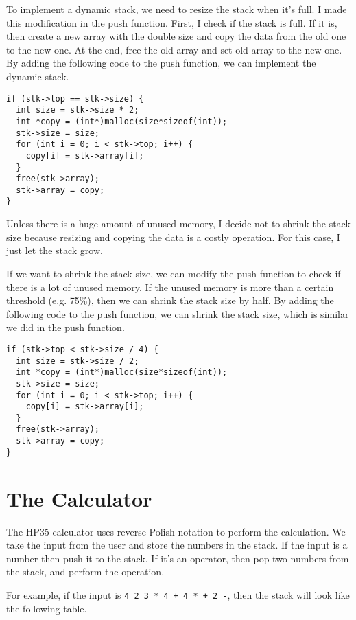 \documentclass[a4paper,11pt]{article}
\begin{document}
To implement a dynamic stack, we need to resize the stack when it's full. I made this modification
in the push function. First, I check if the stack is full. If it is, then create a new array 
with the double size and copy the data from the old one to the new one. At the end, free the old
array and set old array to the new one. By adding the following code to the push function, we can
implement the dynamic stack.

\begin{verbatim}
if (stk->top == stk->size) {
  int size = stk->size * 2;
  int *copy = (int*)malloc(size*sizeof(int));
  stk->size = size;
  for (int i = 0; i < stk->top; i++) {
    copy[i] = stk->array[i];
  }
  free(stk->array);
  stk->array = copy;
}
\end{verbatim}

Unless there is a huge amount of unused memory, I decide not to shrink the stack size because 
resizing and copying the data is a costly operation. For this case, I just let the stack grow.

If we want to shrink the stack size, we can modify the push function to check if there is
a lot of unused memory. If the unused memory is more than a certain threshold (e.g. 75\%),
then we can shrink the stack size by half. By adding the following code to the push function,
we can shrink the stack size, which is similar we did in the push function.

\begin{verbatim}
if (stk->top < stk->size / 4) {
  int size = stk->size / 2;
  int *copy = (int*)malloc(size*sizeof(int));
  stk->size = size;
  for (int i = 0; i < stk->top; i++) {
    copy[i] = stk->array[i];
  }
  free(stk->array);
  stk->array = copy;
}
\end{verbatim}

\section*{The Calculator}

The HP35 calculator uses reverse Polish notation to perform the calculation. We take the input from the user
and store the numbers in the stack. If the input is a
number then push it to the stack. If it's an operator, then pop two numbers from the stack, and
perform the operation.

For example, if the input is {\tt 4 2 3 * 4 + 4 * + 2 -}, then the stack will look like the following table.
\end{document}
